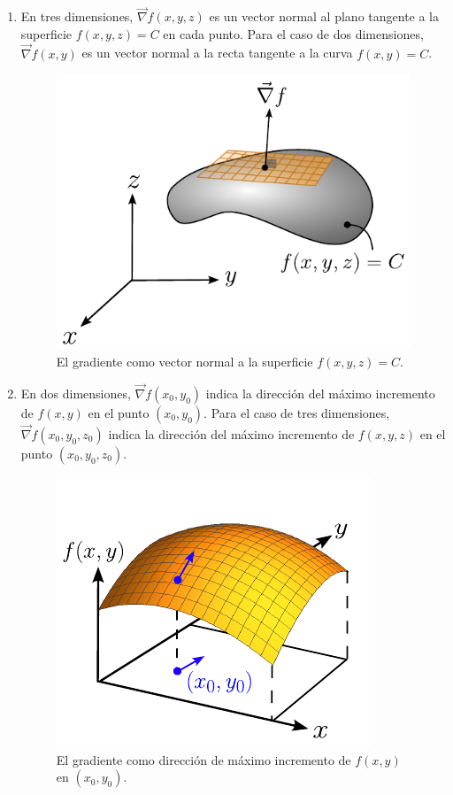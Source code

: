 \begin{enumerate}
\item En tres dimensiones, $\vec{\nabla}f(x,y,z)$ es un vector normal al plano tangente a la superficie $f ( x, y, z ) = C$ en cada punto. Para el caso de dos dimensiones, $\vec{\nabla}f(x,y)$ es un vector normal a la recta tangente a la curva $f(x,y) = C$.

\begin{figure}[H]
    \centering
    \includegraphics[scale = 0.8]{Figuras/Gradiente1.pdf}
    \caption{El gradiente como vector normal a la superficie $f(x,y,z) = C$.}
    \label{fig:Gradiente1}
\end{figure}

\item En dos dimensiones, $\vec{\nabla}f(x_0,y_0)$  indica la dirección del máximo incremento de $f(x,y)$ en el punto $(x_0,y_0)$. Para el caso de tres dimensiones, $\vec{\nabla}f(x_0,y_0,z_0)$  indica la dirección del máximo incremento de $f(x,y,z)$ en el punto $(x_0,y_0,z_0)$. 

\begin{figure}[H]
    \centering
    \includegraphics[scale = 0.89]{Figuras/Gradiente2.pdf}
    \caption{El gradiente como dirección de máximo incremento de $f(x,y)$ en $(x_0,y_0)$.}
    \label{fig:Gradiente2}
\end{figure}

\end{enumerate}

